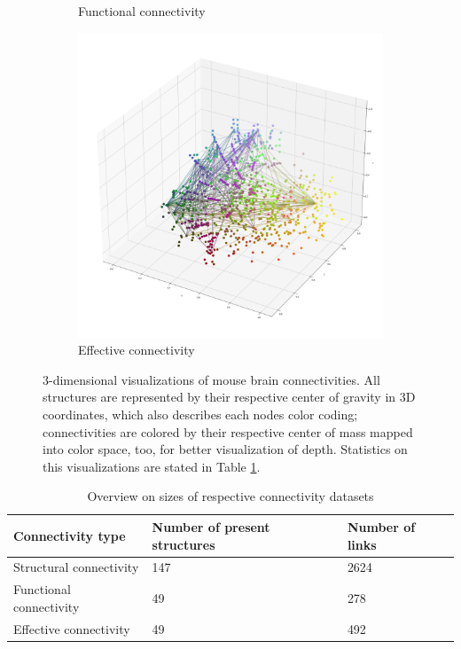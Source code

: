 \documentclass[]{article}
\begin{document}
\begin{figure}
\begin{subfigure}{.3\textwidth}
		\caption{Functional connectivity}
		\label{fig:func_conn_vis}
	\end{subfigure}
	\begin{subfigure}{.3\textwidth}
		\centering
		\includegraphics[width=.9\linewidth]{plotted_figures/eff_3d_conn_plot.png}
		\caption{Effective connectivity}
		\label{fig:eff_conn_vis}
	\end{subfigure}

	\caption[3-dimensional visualizations of mouse brain connectivities]{3-dimensional visualizations of mouse brain connectivities. All structures are represented by their respective center of gravity in 3D coordinates, which also describes each nodes color coding; connectivities are colored by their respective center of mass mapped into color space, too, for better visualization of depth. Statistics on this visualizations are stated in Table \ref{tab:conn_overview}.}
	\label{fig:conn_vis}
\end{figure}

\begin{table}
	\centering
	\begin{tabular}{lll}
		Connectivity type&Number of present structures&Number of links\\
		\hline
		Structural connectivity&147&2624\\
		Functional connectivity&49&278\\
		Effective connectivity&49&492\\
	\end{tabular}
	\caption[Overview on sizes of respective connectivity datasets]{Overview on sizes of respective connectivity datasets}
	\label{tab:conn_overview}
\end{table}
\end{document}
